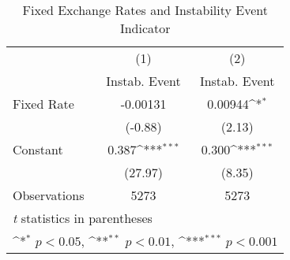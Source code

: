 \begin{table}[htbp]\centering
\def\sym#1{\ifmmode^{#1}\else\(^{#1}\)\fi}
\caption{Fixed Exchange Rates and Instability Event Indicator \label{instabRRalone}}
\begin{tabular}{l*{2}{c}}
\toprule
                                        &\multicolumn{1}{c}{(1)}&\multicolumn{1}{c}{(2)}\\
                                        &\multicolumn{1}{c}{Instab. Event}&\multicolumn{1}{c}{Instab. Event}\\
\midrule
Fixed Rate                              & -0.00131         &  0.00944\sym{*}  \\
                                        &  (-0.88)         &   (2.13)         \\
\addlinespace
Constant                                &    0.387\sym{***}&    0.300\sym{***}\\
                                        &  (27.97)         &   (8.35)         \\
\midrule
Observations                            &     5273         &     5273         \\
\bottomrule
\multicolumn{3}{l}{\footnotesize \textit{t} statistics in parentheses}\\
\multicolumn{3}{l}{\footnotesize \sym{*} \(p<0.05\), \sym{**} \(p<0.01\), \sym{***} \(p<0.001\)}\\
\end{tabular}
\end{table}
